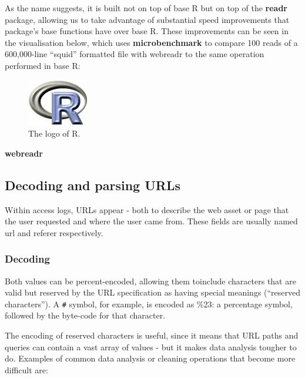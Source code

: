 As the name suggests, it is built not on top of base R but on top of the
\textbf{readr} \citep{readr} package, allowing us to take advantage of
substantial speed improvements that package's base functions have over
base R. These improvements can be seen in the visualisation below, which
uses \textbf{microbenchmark} \citep{microbenchmark} to compare 100 reads
of a 600,000-line ``squid'' formatted file with webreadr to the same
operation performed in base R:

\begin{figure}[htbp]
  \centering
  \includegraphics{Rlogo}
  \caption{The logo of R.}
  \label{figure:rlogo}
\end{figure}

\textbf{webreadr}

\subsection{Decoding and parsing URLs}\label{decoding-and-parsing-urls}

Within access logs, URLs appear - both to describe the web asset or page
that the user requested and where the user came from. These fields are
usually named url and referer respectively.

\subsubsection{Decoding}\label{decoding}

Both values can be percent-encoded, allowing them toinclude characters
that are valid but reserved by the URL specification as having special
meanings (``reserved characters''). A \texttt{\#} symbol, for example,
is encoded as \%23: a percentage symbol, followed by the byte-code for
that character.

The encoding of reserved characters is useful, since it means that URL
paths and queries can contain a vast array of values - but it makes data
analysis tougher to do. Examples of common data analysis or cleaning
operations that become more difficult are:

